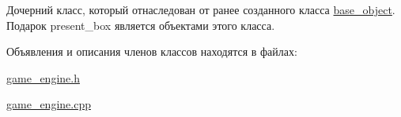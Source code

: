 Дочерний класс, который отнаследован от ранее созданного класса \mbox{\hyperlink{classbase__object}{base\+\_\+object}}. Подарок present\+\_\+box является объектами этого класса. 

Объявления и описания членов классов находятся в файлах\+:\begin{DoxyCompactItemize}
\item 
\mbox{\hyperlink{game__engine_8h}{game\+\_\+engine.\+h}}\item 
\mbox{\hyperlink{game__engine_8cpp}{game\+\_\+engine.\+cpp}}\end{DoxyCompactItemize}
